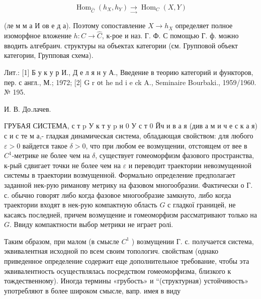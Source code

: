 \documentclass[10pt]{article}
\begin{document}
\[

\operatorname{Hom}_{\widehat{C}}\left(h_{X}, h_{Y}\right) \underset{\rightarrow}{\rightarrow} \operatorname{Hom}_{C}(X, Y)

\]



(ле м м а И ов е д а). Поэтому сопоставление $X \rightarrow h_{X}$ определяет полное изоморфное вложение $h: C \rightarrow \widehat{C}$, к-рое и наз. Г. Ф. С помощью Г. ф. можно вводить алгебраич. структуры на объектах категории (см. Групповой объект категории, Групповая схема).



Лит.: [1] Б у к у р И., Д е л я н у А., Введение в теорию категорий и функторов, пер. с англ., М.; 1972; [2] G r о$\mathrm{t}$ he nd i e ck A., Seminaire Bourbaki., 1959/1960. № 195.

И. В. До.лачев.



ГРУБАЯ СИСТЕМА, с т $\mathrm{p}$ У к т у $\mathrm{p}$ н 0 У с т 0 Йч и в а я (див а м и ч е с к а я) с и с те м а,- гладкая динамическая система, обладающая свойством: для любого $\varepsilon>0$ вайдется такое $\delta>0$, что при любом ее возмущении, отстоящем от вее в $C^{1}$-метрике не более чем на $\delta$, существует гомеоморфизм фазового пространства, к-рый сдвигает точки не более чем на $\varepsilon$ и переводит траектории невозмущенной системы в траектории возмущенной. Формально определение предполагает заданной нек-рую риманову метрику на фазовом многообразии. Фактически о Г. с. обычно говорят либо когда фазовое многообразие замкнуто, либо когда траектории входят в нек-рую компактную область $G$ с гладкої границей, не касаясь последней, причем возмущение и гомеоморфизм рассматривают только на $G$. Ввиду компактности выбор метрики не играет ролі.



Таким образом, при малом (в смысле $C^{1}$ ) возмущении Г. с. получается система, эквивалентная исходной по всем своим топологич. свойствам (однако приведенное определение содержит еще дополнительное требование, чтобы эта эквивалентность осуществлялась посредством гомеоморфизма, близкого к тождественному). Иногда термины «грубость» и “(структурная) устойчивость» употребляют в более широком смысле, вапр. имея в виду
\end{document}

